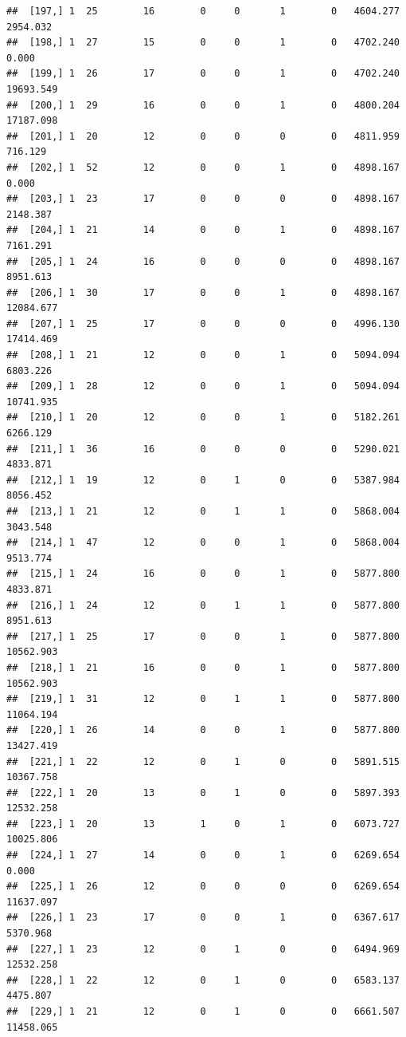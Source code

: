 \documentclass[
]{article}
\begin{document}
\begin{verbatim}
##  [197,] 1  25        16        0     0       1        0   4604.277   2954.032
##  [198,] 1  27        15        0     0       1        0   4702.240      0.000
##  [199,] 1  26        17        0     0       1        0   4702.240  19693.549
##  [200,] 1  29        16        0     0       1        0   4800.204  17187.098
##  [201,] 1  20        12        0     0       0        0   4811.959    716.129
##  [202,] 1  52        12        0     0       1        0   4898.167      0.000
##  [203,] 1  23        17        0     0       0        0   4898.167   2148.387
##  [204,] 1  21        14        0     0       1        0   4898.167   7161.291
##  [205,] 1  24        16        0     0       0        0   4898.167   8951.613
##  [206,] 1  30        17        0     0       1        0   4898.167  12084.677
##  [207,] 1  25        17        0     0       0        0   4996.130  17414.469
##  [208,] 1  21        12        0     0       1        0   5094.094   6803.226
##  [209,] 1  28        12        0     0       1        0   5094.094  10741.935
##  [210,] 1  20        12        0     0       1        0   5182.261   6266.129
##  [211,] 1  36        16        0     0       0        0   5290.021   4833.871
##  [212,] 1  19        12        0     1       0        0   5387.984   8056.452
##  [213,] 1  21        12        0     1       1        0   5868.004   3043.548
##  [214,] 1  47        12        0     0       1        0   5868.004   9513.774
##  [215,] 1  24        16        0     0       1        0   5877.800   4833.871
##  [216,] 1  24        12        0     1       1        0   5877.800   8951.613
##  [217,] 1  25        17        0     0       1        0   5877.800  10562.903
##  [218,] 1  21        16        0     0       1        0   5877.800  10562.903
##  [219,] 1  31        12        0     1       1        0   5877.800  11064.194
##  [220,] 1  26        14        0     0       1        0   5877.800  13427.419
##  [221,] 1  22        12        0     1       0        0   5891.515  10367.758
##  [222,] 1  20        13        0     1       0        0   5897.393  12532.258
##  [223,] 1  20        13        1     0       1        0   6073.727  10025.806
##  [224,] 1  27        14        0     0       1        0   6269.654      0.000
##  [225,] 1  26        12        0     0       0        0   6269.654  11637.097
##  [226,] 1  23        17        0     0       1        0   6367.617   5370.968
##  [227,] 1  23        12        0     1       0        0   6494.969  12532.258
##  [228,] 1  22        12        0     1       0        0   6583.137   4475.807
##  [229,] 1  21        12        0     1       0        0   6661.507  11458.065

\end{verbatim}
\end{document}
